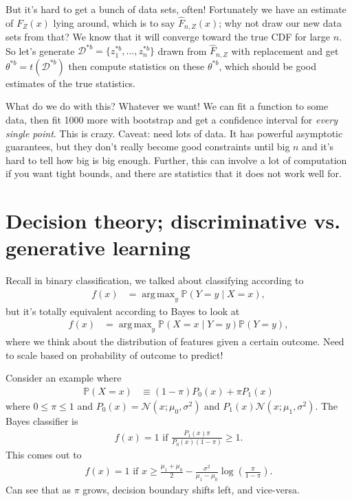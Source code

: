 \documentclass[11pt,letterpaper]{article}
\DeclareMathOperator*{\argmax}{arg\,max}
\theoremstyle{definition}
\theoremstyle{plain}
\numberwithin{equation}{section}
\numberwithin{figure}{section}
\begin{document}
But it's hard to get a bunch of data sets, often! Fortunately we have an estimate of $F_Z(x)$ lying around, which is to say $\hat{F}_{n,Z}(x)$; why not draw our new data sets from that? We know that it will converge toward the true CDF for large $n$. So let's generate $\mathcal{D}^{\ast b} = \{z_1^{\ast b}, \ldots, z_n^{\ast b}\}$ drawn from $\hat{F}_{n,Z}$ with replacement and get $\theta^{\ast b} = t(\mathcal{D}^{\ast b})$ then compute statistics on these $\theta^{\ast b}$, which should be good estimates of the true statistics.


What do we do with this? Whatever we want! We can fit a function to some data, then fit 1000 more with bootstrap and get a confidence interval for \emph{every single point}. This is crazy. Caveat: need lots of data. It has powerful asymptotic guarantees, but they don't really become good constraints until big $n$ and it's hard to tell how big is big enough. Further, this can involve a lot of computation if you want tight bounds, and there are statistics that it does not work well for.











\section{Decision theory; discriminative vs. generative learning}
Recall in binary classification, we talked about classifying according to
%
\begin{align}
	f(x) &= \argmax_y \mathbb{P}(Y=y \mid X=x),
\end{align}
%
but it's totally equivalent according to Bayes to look at
%
\begin{align}
	f(x) &= \argmax_y \mathbb{P}(X=x \mid Y=y) \mathbb{P}(Y=y),
\end{align}
%
where we think about the distribution of features given a certain outcome. Need to scale based on probability of outcome to predict!


Consider an example where
%
\begin{align}
	\mathbb{P}(X=x) &\equiv (1-\pi) P_0(x) + \pi P_1(x)
\end{align}
%
where $0\leq\pi \leq 1$ and $P_0(x) = \mathcal{N}(x; \mu_0, \sigma^2)$ and $P_1(x) \mathcal{N}(x;\mu_1,\sigma^2)$. The Bayes classifier is
%
\begin{align}
	f(x) = 1 \text{ if } \frac{P_1(x) \pi}{P_0(x) (1-\pi)} \geq 1.
\end{align}
%
This comes out to
%
\begin{align}
	f(x) = 1 \text{ if } x \geq \frac{\mu_1 +\mu_0}{2} - \frac{\sigma^2}{\mu_1 - \mu_0} \log\left(\frac{\pi}{1-\pi}\right).
\end{align}
%
Can see that as $\pi$ grows, decision boundary shifts left, and vice-versa.
\end{document}
